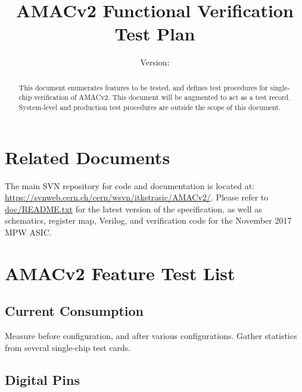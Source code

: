 \documentclass[11pt]{article}   			%
\title{AMACv2 Functional Verification Test Plan}
\author{Version: \Version}
\author{}
\begin{document}
\maketitle
\begin{abstract}

This document enumerates features to be tested, and defines test procedures for single-chip verification of AMACv2. This document will be augmented to act as a test record. System-level and production test procedures are outside 
the scope of this document.

\end{abstract}

\begin{versionhistory}
\end{versionhistory}

\newpage

\tableofcontents

\newpage

\section{Related Documents}

The main SVN repository for code and documentation is located at: \\
\href{https://svnweb.cern.ch/cern/wsvn/itkstrasic/AMACv2/}
{https://svnweb.cern.ch/cern/wsvn/itkstrasic/AMACv2/}. Please refer to 
\href{https://svnweb.cern.ch/cern/wsvn/itkstrasic/AMACv2/doc/README.txt}{doc/README.txt}
for the latest version of the specification, as well as schematics,
register map, Verilog, and verification code for the November 2017 MPW ASIC.

\newpage

\section{AMACv2 Feature Test List}

\subsection{Current Consumption}
Measure before configuration, and after various configurations. Gather statistics from 
several single-chip test cards.

\subsection{Digital Pins}
\end{document}
